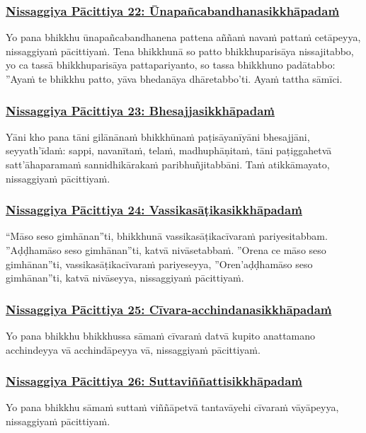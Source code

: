\subsubsection*{\hyperref[forf-exp22]{Nissaggiya Pācittiya 22: Ūnapañcabandhanasikkhāpadaṁ}}
\label{np22}
Yo pana bhikkhu ūnapañcabandhanena pattena aññaṁ navaṁ pattaṁ cetāpeyya, nissaggiyaṁ pācittiyaṁ. Tena bhikkhunā so patto bhikkhuparisāya nissajitabbo, yo ca tassā bhikkhuparisāya pattapariyanto, so tassa bhikkhuno padātabbo: ''Ayaṁ te bhikkhu patto, yāva bhedanāya dhāretabbo'ti. Ayaṁ tattha sāmīci.

\subsubsection*{\hyperref[forf-exp23]{Nissaggiya Pācittiya 23: Bhesajjasikkhāpadaṁ}}
\label{np23}
Yāni kho pana tāni gilānānaṁ bhikkhūnaṁ paṭisāyanīyāni bhesajjāni, seyyath'īdaṁ: sappi, navanītaṁ, telaṁ, madhuphāṇitaṁ, tāni paṭiggahetvā satt'āhaparamaṁ sannidhikārakaṁ paribhuñjitabbāni. Taṁ atikkāmayato, nissaggiyaṁ pācittiyaṁ.

\subsubsection*{\hyperref[forf-exp24]{Nissaggiya Pācittiya 24: Vassikasāṭikasikkhāpadaṁ}}
\label{np24}
``Māso seso gimhānan''ti, bhikkhunā vassikasāṭikacīvaraṁ pariyesitabbam. ''Aḍḍhamāso seso gimhānan''ti, katvā nivāsetabbaṁ. ''Orena ce māso seso gimhānan''ti, vassikasāṭikacīvaraṁ pariyeseyya, ''Oren'aḍḍhamāso seso gimhānan''ti, katvā nivāseyya, nissaggiyaṁ pācittiyaṁ.

\subsubsection*{\hyperref[forf-exp25]{Nissaggiya Pācittiya 25: Cīvara-acchindanasikkhāpadaṁ}}
\label{np25}
Yo pana bhikkhu bhikkhussa sāmaṁ cīvaraṁ datvā kupito anattamano acchindeyya vā acchindāpeyya vā, nissaggiyaṁ pācittiyaṁ.

\subsubsection*{\hyperref[forf-exp26]{Nissaggiya Pācittiya 26: Suttaviññattisikkhāpadaṁ}}
\label{np26}
Yo pana bhikkhu sāmaṁ suttaṁ viññāpetvā tantavāyehi cīvaraṁ vāyāpeyya, nissaggiyaṁ pācittiyaṁ.

